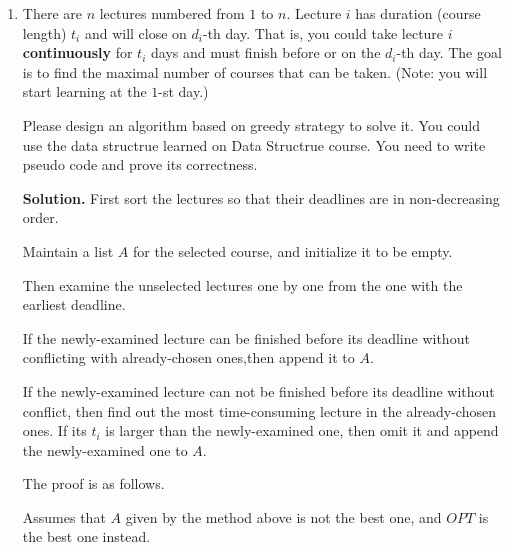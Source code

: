 \documentclass[12pt,a4paper]{article}
\theoremstyle{definition}
\begin{document}
\begin{enumerate}
\begin{proof}
        Tim's idea makes sure the start time of $A[m-k+1]$ is later than $OPT[n-k+1]$.Therefore it does not matter to change $OPT[n-k+1]$ into $A[m-k+1]$.
        
        That is because $OPT[n-k]$ ends before $OPT[n-k+1]$ starts, therefore it ends earlier before $A[m-k+1]$ starts, too.
        
        Therefore this change causes no harm to other jobs in $OPT$.
        
        However, this time the last $k+1$ jobs in $A$ and $OPT$ are the same, which is contradictory to the assumption.
        
        Therefore Tim's idea is the best.
        
    \end{proof}

    \item
    There are $n$ lectures numbered from $1$ to $n$. Lecture $i$ has duration (course length) $t_i$ and will close on $d_i$-th day. That is, you could take lecture $i$ \textbf{continuously} for $t_i$ days and must finish before or on the $d_i$-th day. The goal is to find the maximal number of courses that can be taken. (Note: you will start learning at the $1$-st day.)
    
    Please design an algorithm based on greedy strategy to solve it. You could use the data structrue learned on Data Structrue course. You need to write pseudo code and prove its correctness.
    
    \textbf{Solution.}
        First sort the lectures so that their deadlines are in non-decreasing order.
        
        Maintain a list $A$ for the selected course, and initialize it to be empty.
        
        Then examine the unselected lectures one by one from the one with the earliest deadline.
        
        If the newly-examined lecture can be finished before its deadline without conflicting with already-chosen ones,then append it to $A$.
        
        If the newly-examined lecture can not be finished before its deadline without conflict, then find out the most time-consuming lecture in the already-chosen ones. If its $t_i$ is larger than the newly-examined one, then omit it and append the newly-examined one to $A$.  
        
        The proof is as follows.
       
        Assumes that $A$ given by the method above is not the best one, and $OPT$ is the best one instead.
        

\end{enumerate}
\end{document}
